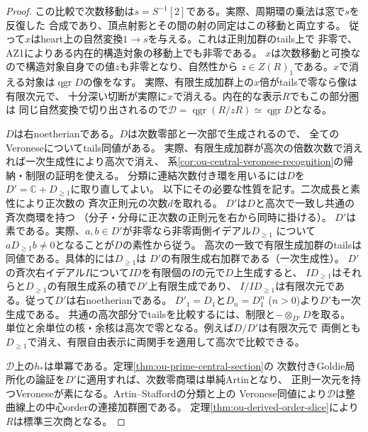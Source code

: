 \documentclass[11pt,a4paper]{ltjsarticle}
\theoremstyle{definition}
\newcommand{\qgr}{\operatorname{qgr}}
\begin{document}
\begin{proof}
この比較で次数移動は$s=S^{-1}[2]$である。実際、周期環の乗法は窓で$s$を反復した
合成であり、頂点射影とその間の射の同定はこの移動と両立する。
従って$x$はheart上の自然変換$1\to s$を与える。これは正則加群のtails上で
非零で、AZ1によりある内在的構造対象の移動上でも非零である。
$x$は次数移動と可換なので構造対象自身での値$z$も非零となり、自然性から
$z\in Z(R)_1$である。$x$で消える対象は$\qgr D$の像をなす。
実際、有限生成加群上の$x$倍がtailsで零なら像は有限次元で、
十分深い切断が実際に$x$で消える。内在的な表示$R$でもこの部分圏は
同じ自然変換で切り出されるので$\mathcal D=\qgr(R/zR)\simeq\qgr D$となる。

$D$は右noetherianである。$D$は次数零部と一次部で生成されるので、
全てのVeroneseについてtails同値がある。
実際、有限生成加群が高次の倍数次数で消えれば一次生成性により高次で消え、
系\ref{cor:ou-central-veronese-recognition}の帰納・制限の証明を使える。
分類に連結次数付き環を用いるには$D$を$D'=\mathbb C+D_{\ge1}$に取り直してよい。
以下にその必要な性質を記す。二次成長と素性により正次数の
斉次正則元の次数$d$を取れる\cite[\S6]{StaffordVdB2001}。
$D'$は$D$と高次で一致し共通の斉次商環を持つ
（分子・分母に正次数の正則元を右から同時に掛ける）。
$D'$は素である。実際、$a,b\in D'$が非零なら非零両側イデアル$D_{\ge1}$
について$ aD_{\ge1}b\ne0$となることが$D$の素性から従う。
高次の一致で有限生成加群のtailsは同値である。具体的には$D_{\ge1}$は
$D'$の有限生成右加群である（一次生成性）。
$D'$の斉次右イデアル$I$について$ID$を有限個の$I$の元で$D$上生成すると、
$ID_{\ge1}$はそれらと$D_{\ge1}$の有限生成系の積で$D'$上有限生成であり、
$I/ID_{\ge1}$は有限次元である。従って$D'$は右noetherianである。
$D'_1=D_1$と$D_n=D_1^n$ ($n>0$)より$D'$も一次生成である。
共通の高次部分でtailsを比較するには、制限と$-\otimes_{D'}D$を取る。
単位と余単位の核・余核は高次で零となる。例えば$D/D'$は有限次元で
両側とも$D_{\ge1}$で消え、有限自由表示に両関手を適用して高次で比較できる。

$\mathcal D$上の$h_*$は単冪である。定理\ref{thm:ou-prime-central-section}の
次数付きGoldie局所化の論証を$D'$に適用すれば、次数零商環は単純Artinとなり、
正則一次元を持つVeroneseが素になる。Artin--Staffordの分類と上の
Veronese同値により$\mathcal D$は整曲線上の中心orderの連接加群圏である。
定理\ref{thm:ou-derived-order-slice}により$R$は標準三次商となる。
\end{proof}
\end{document}
